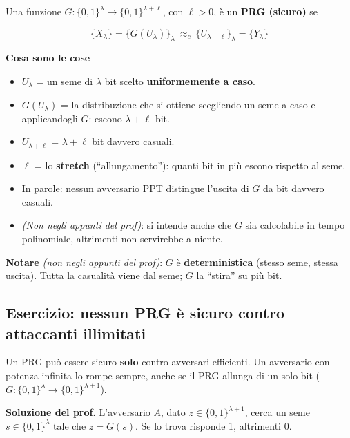 Una funzione \(G : \{0,1\}^\lambda \to \{0,1\}^{\lambda + \ell}\), con \(\ell > 0\), è un \textbf{PRG (sicuro)} se

\[
\{X_\lambda\} = \{G(U_\lambda)\}_\lambda \ \approx_c \ \{U_{\lambda + \ell}\}_\lambda = \{Y_\lambda\}
\]

\begin{nota}

\textbf{Cosa sono le cose}

\begin{itemize}
\tightlist
\item
  \(U_\lambda\) = un seme di \(\lambda\) bit scelto \textbf{uniformemente a caso}.
\item
  \(G(U_\lambda)\) = la distribuzione che si ottiene scegliendo un seme a caso e applicandogli \(G\): escono \(\lambda + \ell\) bit.
\item
  \(U_{\lambda + \ell}\) = \(\lambda + \ell\) bit davvero casuali.
\item
  \(\ell\) = lo \textbf{stretch} (``allungamento''): quanti bit in più escono rispetto al seme.
\item
  In parole: nessun avversario PPT distingue l'uscita di \(G\) da bit davvero casuali.
\item
  \emph{(Non negli appunti del prof)}: si intende anche che \(G\) sia calcolabile in tempo polinomiale, altrimenti non servirebbe a niente.
\end{itemize}

\end{nota}

\textbf{Notare} \emph{(non negli appunti del prof)}: \(G\) è \textbf{deterministica} (stesso seme, stessa uscita). Tutta la casualità viene dal seme; \(G\) la ``stira'' su più bit.

\subsection{Esercizio: nessun PRG è sicuro contro attaccanti illimitati}

\begin{inbreve}

Un PRG può essere sicuro \textbf{solo} contro avversari efficienti. Un avversario con potenza infinita lo rompe sempre, anche se il PRG allunga di un solo bit (\(G : \{0,1\}^\lambda \to \{0,1\}^{\lambda+1}\)).

\end{inbreve}

\textbf{Soluzione del prof.} L'avversario \(A\), dato \(z \in \{0,1\}^{\lambda+1}\), cerca un seme \(s \in \{0,1\}^\lambda\) tale che \(z = G(s)\). Se lo trova risponde 1, altrimenti 0.

